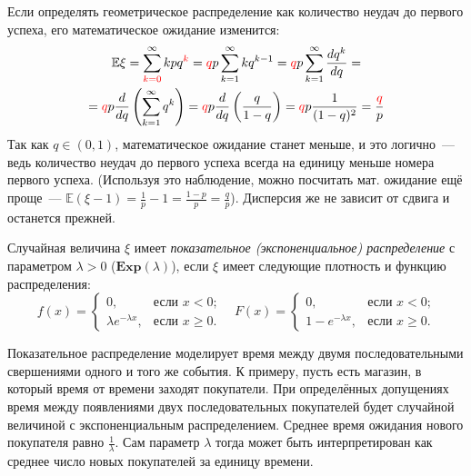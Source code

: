 \begin{rmrk}
    Если определять геометрическое распределение как количество неудач до первого успеха, его математическое ожидание изменится:
    \begin{multline*}
        \mathbb{E} \xi=\sum\limits^{\infty}_{\color{red}k=0} k p q^{\color{red}k}= {\color{red}q}p \sum\limits_{k=1}^{\infty} k q^{k-1}= {\color{red}q}p \sum\limits_{k=1}^{\infty} \frac{d q^{k}}{d q} = \\
        = {\color{red}q}p \frac{d}{d q}\left(\sum\limits_{k=1}^{\infty} q^{k}\right)={\color{red}q} p \frac{d}{d q}\left(\frac{q}{1-q}\right)= {\color{red}q}p \frac{1}{(1-q)^{2}}=\frac{{\color{red}q}}{p}
    \end{multline*}
    Так как $q \in (0,1)$, математическое ожидание станет меньше, и это логично~--- ведь количество неудач до первого успеха всегда на единицу меньше номера первого успеха. 
    (Используя это наблюдение, можно посчитать мат. ожидание ещё проще~--- $\mathbb{E}(\xi - 1) = \frac{1}{p} - 1 = \frac{1-p}{p} = \frac{q}{p}$). 
    Дисперсия же не зависит от сдвига и останется прежней.
\end{rmrk}

\begin{defn}
    Случайная величина $\xi$ имеет \textit{показательное (экспоненциальное) распределение} с параметром $\lambda > 0$ ($\mathbf{Exp}(\lambda)$), 
    если $\xi$ имеет следующие плотность и функцию распределения:
    \begin{equation*}
        f(x) = 
        \begin{cases}
            0, & \text{если $x < 0$;} \\
            \lambda e^{-\lambda x}, & \text{если $x \geqslant 0$.}
        \end{cases}
        \quad 
        F(x) = 
        \begin{cases}
            0, & \text{если $x < 0$;} \\
            1 - e^{-\lambda x}, & \text{если $x \geqslant 0$.}
        \end{cases}
    \end{equation*}
\end{defn}

\begin{rmrk}
    Показательное распределение моделирует время между двумя последовательными свершениями одного и того же события. 
    К примеру, пусть есть магазин, в который время от времени заходят покупатели. 
    При определённых допущениях время между появлениями двух последовательных покупателей будет случайной величиной с экспоненциальным распределением. 
    Среднее время ожидания нового покупателя равно $\frac{1}{\lambda}$. 
    Сам параметр $\lambda$ тогда может быть интерпретирован как среднее число новых покупателей за единицу времени. 
\end{rmrk}

